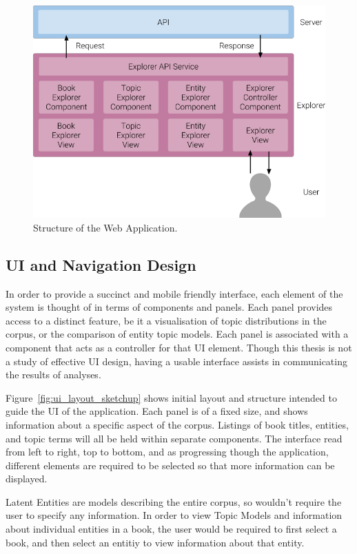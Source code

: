 \documentclass[10pt]{report}
\begin{document}
\begin{figure}[h!]
  \centering
  \includegraphics[scale=0.65]{web_app_structure}

  \caption{Structure of the Web Application. \label{fig:web_app_structure}}
\end{figure}

\subsection{UI and Navigation Design }
In order to provide a succinct and mobile friendly interface, each element of the system is thought of in terms of components and panels. Each panel provides access to a distinct feature, be it a visualisation of topic distributions in the corpus, or the comparison of entity topic models. Each panel is associated with a component that acts as a controller for that UI element. Though this thesis is not a study of effective UI design, having a usable interface assists in communicating the results of analyses.

Figure~\ref{fig:ui_layout_sketchup} shows initial layout and structure intended to guide the UI of the application. Each panel is of a fixed size, and shows information about a specific aspect of the corpus. Listings of book titles, entities, and topic terms will all be held within separate components. The interface read from left to right, top to bottom, and as progressing though the application, different elements are required to be selected so that more information can be displayed.

Latent Entities are models describing the entire corpus, so wouldn't require the user to specify any information. In order to view Topic Models and information about individual entities in a book, the user would be required to first select a book, and then select an entitiy to view information about that entity.
\end{document}
